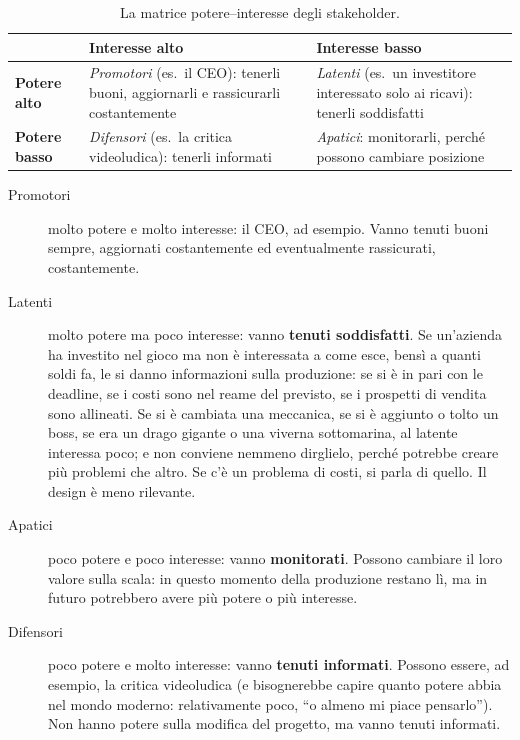 \begin{table}[htbp]
  \centering
  \caption{La matrice potere--interesse degli stakeholder.}
  \label{tab:potere-interesse}
  \begin{tabular}{@{}p{}p{}p{}@{}}
    \toprule
    & \textbf{Interesse alto} & \textbf{Interesse basso} \\
    \midrule
    \textbf{Potere alto} & \emph{Promotori} (es.\ il CEO): tenerli buoni,
      aggiornarli e rassicurarli costantemente &
      \emph{Latenti} (es.\ un investitore interessato solo ai ricavi):
      tenerli soddisfatti \\
    \addlinespace
    \textbf{Potere basso} & \emph{Difensori} (es.\ la critica
      videoludica): tenerli informati &
      \emph{Apatici}: monitorarli, perché possono cambiare posizione \\
    \bottomrule
  \end{tabular}
\end{table}

\begin{description}
  \item[Promotori] molto potere e molto interesse: il CEO, ad esempio. Vanno
        tenuti buoni sempre, aggiornati costantemente ed eventualmente
        rassicurati, costantemente.
  \item[Latenti] molto potere ma poco interesse: vanno \textbf{tenuti
        soddisfatti}. Se un'azienda ha investito nel gioco ma non è
        interessata a come esce, bensì a quanti soldi fa, le si danno
        informazioni sulla produzione: se si è in pari con le deadline, se i
        costi sono nel reame del previsto, se i prospetti di vendita sono
        allineati. Se si è cambiata una meccanica, se si è aggiunto o tolto un
        boss, se era un drago gigante o una viverna sottomarina, al latente
        interessa poco; e non conviene nemmeno dirglielo, perché potrebbe
        creare più problemi che altro. Se c'è un problema di costi, si parla di
        quello. Il design è meno rilevante.
  \item[Apatici] poco potere e poco interesse: vanno \textbf{monitorati}.
        Possono cambiare il loro valore sulla scala: in questo momento della
        produzione restano lì, ma in futuro potrebbero avere più potere o più
        interesse.
  \item[Difensori] poco potere e molto interesse: vanno \textbf{tenuti
        informati}. Possono essere, ad esempio, la critica videoludica (e
        bisognerebbe capire quanto potere abbia nel mondo moderno:
        relativamente poco, ``o almeno mi piace pensarlo''). Non hanno potere
        sulla modifica del progetto, ma vanno tenuti informati.
\end{description}

